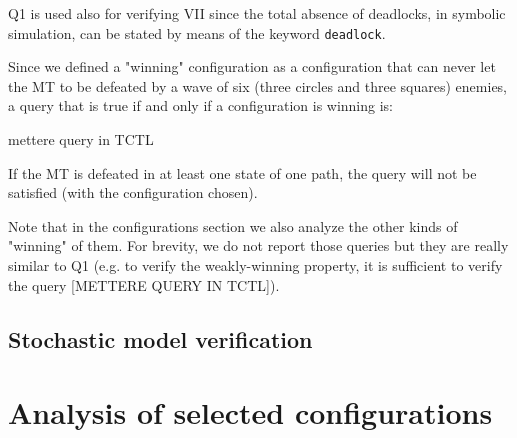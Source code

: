 \documentclass[
10pt, %
a4paper, %
oneside, %
headinclude,footinclude, %
BCOR5mm, %
]{scrartcl}
\begin{document}
				Q1 is used also for verifying VII since the total absence of deadlocks, in symbolic simulation, can be stated by means of the keyword \texttt{deadlock}.
				
				Since we defined a "winning" configuration as a configuration that can never let the MT to be defeated by a wave of six (three circles and three squares) enemies, a query that is true if and only if a configuration is winning is:
				\begin{center}
					mettere query in TCTL
				\end{center}
				If the MT is defeated in at least one state of one path, the query will not be satisfied (with the configuration chosen).
				
				Note that in the configurations section we also analyze the other kinds of "winning" of them. For brevity, we do not report those queries but they are really similar to Q1 (e.g. to verify the weakly-winning property, it is sufficient to verify the query [METTERE QUERY IN TCTL]).
		\subsection{Stochastic model verification}
	\newpage
	\section{Analysis of selected configurations}
\end{document}
